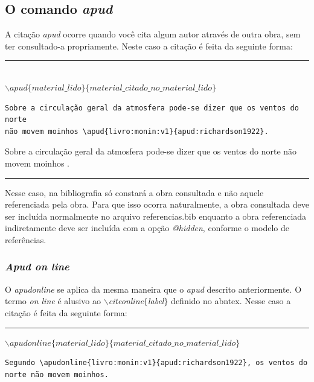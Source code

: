 \documentclass[oneside,openright,12pt]{ufsm_2015} %
\begin{document}
  \subsection{O comando \textit{apud}}
  \par A citação \textit{apud} ocorre quando você cita algum autor através de outra obra, sem ter consultado-a propriamente. Neste caso a citação é feita da seguinte forma:
  \begin{center}
  \rule{0.5\textwidth}{1pt}\\
  $\backslash apud\{material\_lido\}\{material\_citado\_no\_material\_lido\}$ \\
  \end{center}
\begin{verbatim}
Sobre a circulação geral da atmosfera pode-se dizer que os ventos do norte
não movem moinhos \apud{livro:monin:v1}{apud:richardson1922}.
\end{verbatim}
  
  Sobre a circulação geral da atmosfera pode-se dizer que os ventos do norte não movem moinhos .
\begin{center}\rule{0.5\textwidth}{1pt}\end{center}  
  \par Nesse caso, na bibliografia só constará a obra consultada e não aquele referenciada pela obra. Para que isso ocorra naturalmente, a obra consultada deve ser incluída normalmente no arquivo referencias.bib enquanto a obra referenciada indiretamente deve ser incluída com a opção \textit{@hidden}, conforme o modelo de referências.

      \subsubsection{\textit{Apud on line}}
      
      \par O \textit{apudonline} se aplica da mesma maneira que o \textit{apud} descrito anteriormente. O termo \textit{on line} é alusivo ao \textit{$\backslash$citeonline$\{$label$\}$} definido no abntex. Nesse caso a citação é feita da seguinte forma:
      \begin{center}
      \rule{0.5\textwidth}{1pt}
            $\backslash apudonline\{material\_lido\}\{material\_citado\_no\_material\_lido\}$ \\
	    \end{center}

 \begin{verbatim}
Segundo \apudonline{livro:monin:v1}{apud:richardson1922}, os ventos do
norte não movem moinhos.
\end{verbatim}
\end{document}
